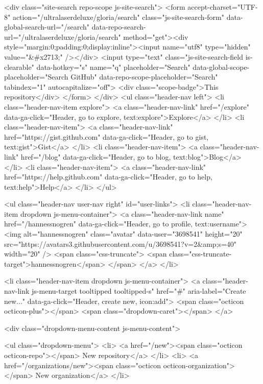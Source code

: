       <div class="site-search repo-scope js-site-search">
          <form accept-charset="UTF-8" action="/ultralaserdeluxe/gloria/search" class="js-site-search-form" data-global-search-url="/search" data-repo-search-url="/ultralaserdeluxe/gloria/search" method="get"><div style="margin:0;padding:0;display:inline"><input name="utf8" type="hidden" value="&#x2713;" /></div>
  <input type="text"
    class="js-site-search-field is-clearable"
    data-hotkey="s"
    name="q"
    placeholder="Search"
    data-global-scope-placeholder="Search GitHub"
    data-repo-scope-placeholder="Search"
    tabindex="1"
    autocapitalize="off">
  <div class="scope-badge">This repository</div>
</form>
      </div>
      <ul class="header-nav left">
        <li class="header-nav-item explore">
          <a class="header-nav-link" href="/explore" data-ga-click="Header, go to explore, text:explore">Explore</a>
        </li>
          <li class="header-nav-item">
            <a class="header-nav-link" href="https://gist.github.com" data-ga-click="Header, go to gist, text:gist">Gist</a>
          </li>
          <li class="header-nav-item">
            <a class="header-nav-link" href="/blog" data-ga-click="Header, go to blog, text:blog">Blog</a>
          </li>
        <li class="header-nav-item">
          <a class="header-nav-link" href="https://help.github.com" data-ga-click="Header, go to help, text:help">Help</a>
        </li>
      </ul>

    
<ul class="header-nav user-nav right" id="user-links">
  <li class="header-nav-item dropdown js-menu-container">
    <a class="header-nav-link name" href="/hannessnogren" data-ga-click="Header, go to profile, text:username">
      <img alt="hannessnogren" class="avatar" data-user="3698541" height="20" src="https://avatars3.githubusercontent.com/u/3698541?v=2&amp;s=40" width="20" />
      <span class="css-truncate">
        <span class="css-truncate-target">hannessnogren</span>
      </span>
    </a>
  </li>

  <li class="header-nav-item dropdown js-menu-container">
    <a class="header-nav-link js-menu-target tooltipped tooltipped-s" href="#" aria-label="Create new..." data-ga-click="Header, create new, icon:add">
      <span class="octicon octicon-plus"></span>
      <span class="dropdown-caret"></span>
    </a>

    <div class="dropdown-menu-content js-menu-content">
      
<ul class="dropdown-menu">
  <li>
    <a href="/new"><span class="octicon octicon-repo"></span> New repository</a>
  </li>
  <li>
    <a href="/organizations/new"><span class="octicon octicon-organization"></span> New organization</a>
  </li>


